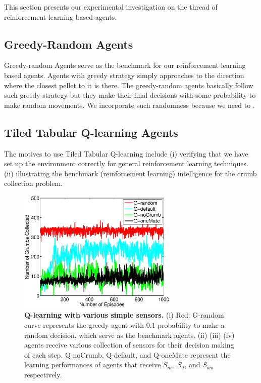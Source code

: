 \documentclass[conference]{IEEEtran}
\begin{document}
This section presents our experimental investigation on the thread of reinforcement
learning based agents.

\subsection{Greedy-Random Agents} 
Greedy-random Agents serve as the benchmark for our reinforcement
learning based agents.
Agents with greedy strategy simply approaches to the direction where the
closest pellet to it is there.
The greedy-random agents basically follow such greedy strategy but they make
their final decisions with some probability to make random movements. 
We incorporate such randomness because we need to .

\subsection{Tiled Tabular Q-learning Agents}
The motives to use Tiled Tabular Q-learning include
(i) verifying that we have set up the environment correctly for general
reinforcement learning techniques. 
(ii) illustrating the benchmark (reinforcement learning) intelligence for the
crumb collection problem.

\begin{figure}[!t]
\centering
\includegraphics[width=3.0in]{./figures/RL/init_setup1.eps}
\caption{\textbf{Q-learning with various simple sensors.} (i) Red: G-random curve
    represents the greedy agent with $0.1$ probability to make a random
    decision, which serve as the benchmark agents. 
    (ii) (iii) (iv) agents receive various collection of sensors for their
    decision making of each step. Q-noCrumb, Q-default, and Q-oneMate
    represent the learning performances of agents that receive $S_{nc}$,
    $S_{d}$, and $S_{om}$ respectively.
} 
\label{fig:RL_init}
\end{figure}
\end{document}
